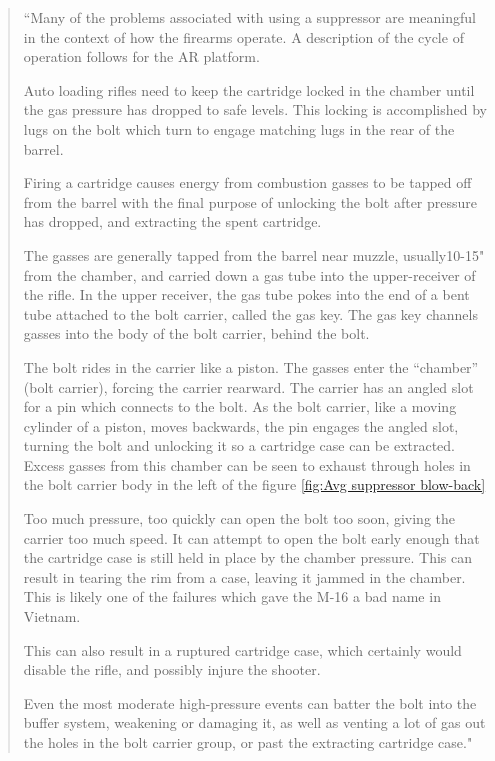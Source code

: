 \begin{quote}
	
	``Many of the problems associated with using a suppressor are meaningful in the context of how the firearms operate.  A description of the cycle of operation follows for the AR platform.
	
	
	
	Auto loading rifles need to keep the cartridge locked in the chamber until the gas pressure has dropped to safe levels.  This locking is accomplished by lugs on the bolt which turn to engage matching lugs in the rear of the barrel.
	
	
	
	Firing a cartridge causes energy from combustion gasses to be tapped off from the barrel with the final purpose of unlocking the bolt after pressure has dropped, and extracting the spent cartridge.
	
	
	
	The gasses are generally tapped from the barrel near muzzle, usually10-15" from the chamber, and carried down a gas tube into the upper-receiver of the rifle.  In the upper receiver, the gas tube pokes into the end of a bent tube attached to the bolt carrier, called the gas key.  The gas key channels gasses into the body of the bolt carrier, behind the bolt.
	
	
	
	The bolt rides in the carrier like a piston.  The gasses enter the “chamber” (bolt carrier), forcing the carrier rearward.  The carrier has an angled slot for a pin which connects to the bolt.  As the bolt carrier, like a moving cylinder of a piston, moves backwards, the pin engages the angled slot, turning the bolt and unlocking it so a cartridge case can be extracted.   Excess gasses from this chamber can be seen to exhaust through holes in the bolt carrier body in the left of the figure \ref{fig:Avg suppressor blow-back}
	
	
	
	Too much pressure, too quickly can open the bolt too soon, giving the carrier too much speed.  It can attempt to open the bolt early enough that the cartridge case is still held in place by the chamber pressure.  This can result in tearing the rim from a case, leaving it jammed in the chamber.   This is likely one of the failures which gave the M-16 a bad name in Vietnam.
	
	
	
	This can also result in a ruptured cartridge case, which certainly would disable the rifle, and possibly injure the shooter.
	
	
	
	Even the most moderate high-pressure events can batter the bolt into the buffer system, weakening or damaging it, as well as venting a lot of gas out the holes in the bolt carrier group, or past the extracting cartridge case."
	
\end{quote}






